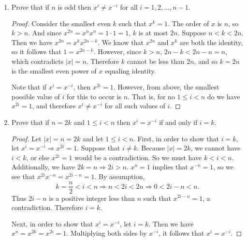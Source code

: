 \documentclass{article}
\begin{document}
\begin{enumerate}[label=(\alph*)]
      \item Prove that if $n$ is odd then $x^i \neq x^{-i}$ for all $i = 1, 2, ..., n - 1$.
            \begin{proof}
                  Consider the smallest even $k$ such that $x^k = 1$. The order of $x$ is $n$, so $k > n$. And since $x^{2n} = x^n x^n = 1 \cdot 1 = 1$, $k$ is at most $2n$. Suppose $n < k < 2n$. Then we have $x^{2n} = x^k x^{2n - k}$. We know that $x^{2n}$ and $x^k$ are both the identity, so it follows that $1 = x^{2n - k}$. However, since $k > n$, $2n - k < 2n - n = n$, which contradicts $|x| = n$. Therefore $k$ cannot be less than $2n$, and so $k = 2n$ is the smallest even power of $x$ equaling identity.

                  Note that if $x^i = x^{-i}$, then $x^{2i} = 1$. However, from above, the smallest possible value of $i$ for this to occur is $n$. That is, for no $1 \leq i < n$ do we have $x^{2i} = 1$, and therefore $x^i \neq x^{-i}$ for all such values of $i$.
            \end{proof}
      \item Prove that if $n = 2k$ and $1 \leq i < n$ then $x^i = x^{-i}$ if and only if $i = k$.
            \begin{proof}
                  Let $|x| = n = 2k$ and let $1 \leq i < n$. First, in order to show that $i = k$, let $x^i = x^{-i} \Rightarrow x^{2i} = 1$. Suppose that $i \neq k$. Because $|x| = 2k$, we cannot have $i < k$, or else $x^{2i} = 1$ would be a contradiction. So we must have $k < i < n$. Additionally, we have $2k = n \Rightarrow 2i > n$. $x^n = 1$ implies that $x^{-n} = 1$, so we see that $x^{2i} x^{-n} = x^{2i - n} = 1$. By assumption,
                  \begin{equation*}
                        k = \frac{n}{2} < i < n \Rightarrow n < 2i < 2n \Rightarrow 0 < 2i - n < n.
                  \end{equation*}
                  Thus $2i - n$ is a positive integer less than $n$ such that $x^{2i - n} = 1$, a contradiction. Therefore $i = k$.

                  Next, in order to show that $x^i = x^{-i}$, let $i = k$. Then we have $x^n = x^{2k} = x^{2i} = 1$. Multiplying both sides by $x^{-i}$, it follows that $x^i = x^{-i}$.
            \end{proof}
\end{enumerate}
\end{document}
